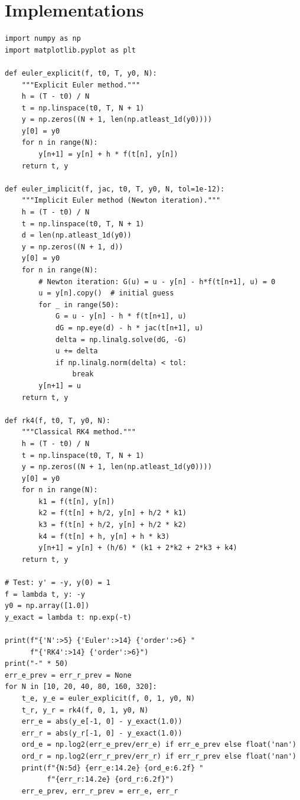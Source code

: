 \section{Implementations}

\begin{codeblock}[title=\textbf{Python --- ODE solvers}]
\begin{verbatim}
import numpy as np
import matplotlib.pyplot as plt

def euler_explicit(f, t0, T, y0, N):
    """Explicit Euler method."""
    h = (T - t0) / N
    t = np.linspace(t0, T, N + 1)
    y = np.zeros((N + 1, len(np.atleast_1d(y0))))
    y[0] = y0
    for n in range(N):
        y[n+1] = y[n] + h * f(t[n], y[n])
    return t, y

def euler_implicit(f, jac, t0, T, y0, N, tol=1e-12):
    """Implicit Euler method (Newton iteration)."""
    h = (T - t0) / N
    t = np.linspace(t0, T, N + 1)
    d = len(np.atleast_1d(y0))
    y = np.zeros((N + 1, d))
    y[0] = y0
    for n in range(N):
        # Newton iteration: G(u) = u - y[n] - h*f(t[n+1], u) = 0
        u = y[n].copy()  # initial guess
        for _ in range(50):
            G = u - y[n] - h * f(t[n+1], u)
            dG = np.eye(d) - h * jac(t[n+1], u)
            delta = np.linalg.solve(dG, -G)
            u += delta
            if np.linalg.norm(delta) < tol:
                break
        y[n+1] = u
    return t, y

def rk4(f, t0, T, y0, N):
    """Classical RK4 method."""
    h = (T - t0) / N
    t = np.linspace(t0, T, N + 1)
    y = np.zeros((N + 1, len(np.atleast_1d(y0))))
    y[0] = y0
    for n in range(N):
        k1 = f(t[n], y[n])
        k2 = f(t[n] + h/2, y[n] + h/2 * k1)
        k3 = f(t[n] + h/2, y[n] + h/2 * k2)
        k4 = f(t[n] + h, y[n] + h * k3)
        y[n+1] = y[n] + (h/6) * (k1 + 2*k2 + 2*k3 + k4)
    return t, y

# Test: y' = -y, y(0) = 1
f = lambda t, y: -y
y0 = np.array([1.0])
y_exact = lambda t: np.exp(-t)

print(f"{'N':>5} {'Euler':>14} {'order':>6} "
      f"{'RK4':>14} {'order':>6}")
print("-" * 50)
err_e_prev = err_r_prev = None
for N in [10, 20, 40, 80, 160, 320]:
    t_e, y_e = euler_explicit(f, 0, 1, y0, N)
    t_r, y_r = rk4(f, 0, 1, y0, N)
    err_e = abs(y_e[-1, 0] - y_exact(1.0))
    err_r = abs(y_r[-1, 0] - y_exact(1.0))
    ord_e = np.log2(err_e_prev/err_e) if err_e_prev else float('nan')
    ord_r = np.log2(err_r_prev/err_r) if err_r_prev else float('nan')
    print(f"{N:5d} {err_e:14.2e} {ord_e:6.2f} "
          f"{err_r:14.2e} {ord_r:6.2f}")
    err_e_prev, err_r_prev = err_e, err_r
\end{verbatim}
\end{codeblock}


